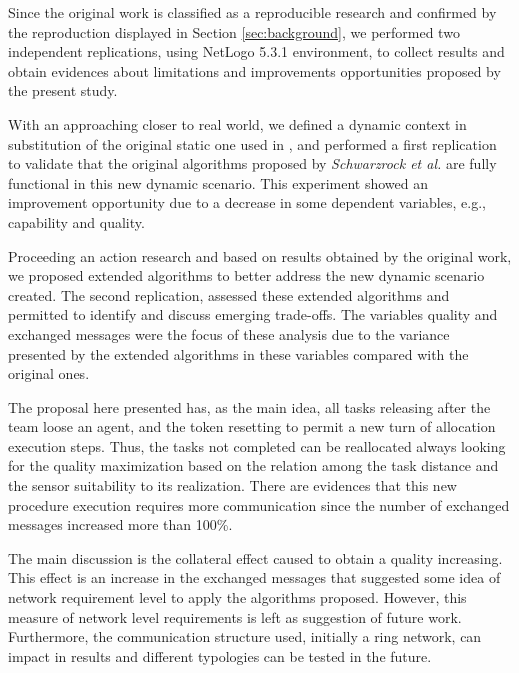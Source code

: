 Since the original work \cite{MAS07} is classified as a reproducible research\cite{exp02} and confirmed by the reproduction displayed in Section \ref{sec:background}, we performed two independent replications, using NetLogo 5.3.1 environment, to collect results and obtain evidences about limitations and improvements opportunities proposed by the present study.

With an approaching closer to real world, we defined a dynamic context in substitution of the original static one used in \cite{MAS07}, and performed a first replication to validate that the original algorithms proposed by \textit{Schwarzrock et al.} are fully functional in this new dynamic scenario. This experiment showed an improvement opportunity due to a decrease in some dependent variables, e.g., capability and quality. 

Proceeding an action research and based on results obtained by the original work, we proposed extended algorithms to better address the new dynamic scenario created. The second replication, assessed these extended algorithms and permitted to identify and discuss emerging trade-offs. The variables quality and exchanged messages were the focus of these analysis due to the variance presented by the extended algorithms in these variables compared with the original ones.

The proposal here presented has, as the main idea, all tasks releasing after the team loose an agent, and the token resetting to permit a new turn of allocation execution steps. Thus, the tasks not completed can be reallocated always looking for the quality maximization based on the relation among the task distance and the sensor suitability to its realization. There are evidences that this new procedure execution requires more communication since the number of exchanged messages increased more than 100\%.

The main discussion is the collateral effect caused to obtain a quality increasing. This effect is an increase in the exchanged messages that suggested some idea of network requirement level to apply the algorithms proposed. However, this measure of network level requirements is left as suggestion of future work. Furthermore, the communication structure used, initially a ring network, can impact in results and different typologies can be tested in the future.
